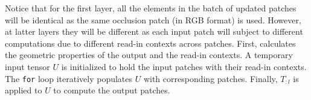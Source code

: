 \begin{algorithm}
\end{algorithm}


Notice that for the first layer, all the elements in the batch of updated patches will be identical as the same occlusion patch (in RGB format) is used.
However, at latter layers they will be different as each input patch will subject to different computations due to different read-in contexts across patches.
First,  calculates the geometric properties of the output and the read-in contexts.
A temporary input tensor $U$ is initialized to hold the input patches with their read-in contexts.
The \texttt{for} loop iteratively populates $U$ with corresponding patches.
Finally, $T_{:l}$ is applied to $U$ to compute the output patches.


